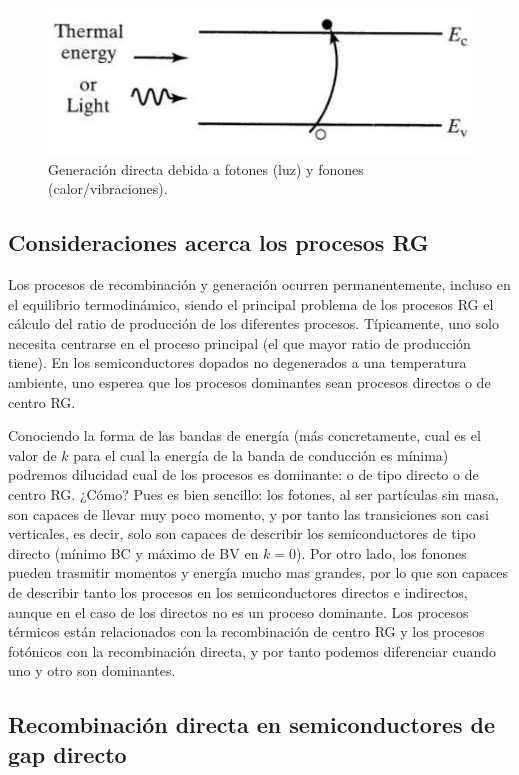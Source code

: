 \begin{figure}[h!] \centering
	\includegraphics[width=0.5\linewidth]{Cuerpo/Ch_02/02_G_Directa.png}
	\caption{Generación directa debida a fotones (luz) y fonones (calor/vibraciones).}
\end{figure}


\subsection{Consideraciones acerca los procesos RG}

Los procesos de recombinación y generación ocurren permanentemente, incluso en el equilibrio termodinámico, siendo el principal problema de los procesos RG el cálculo del ratio de producción de los diferentes procesos. Típicamente, uno solo necesita centrarse en el proceso principal (el que mayor ratio de producción tiene). En los semiconductores dopados no degenerados a una temperatura ambiente, uno esperea que los procesos dominantes sean procesos directos o de centro RG.

Conociendo la forma de las bandas de energía (más concretamente, cual es el valor de $k$ para el cual la energía de la banda de conducción es mínima) podremos dilucidad cual de los procesos es dominante: o de tipo directo o de centro RG. ¿Cómo? Pues es bien sencillo: los fotones, al ser partículas sin masa, son capaces de llevar muy poco momento, y por tanto las transiciones son casi verticales, es decir, solo son capaces de describir los semiconductores de tipo directo (mínimo BC y máximo de BV en $k=0$). Por otro lado, los fonones pueden trasmitir momentos y energía mucho mas grandes, por lo que son capaces de describir tanto los procesos en los semiconductores directos e indirectos, aunque en el caso de los directos no es un proceso dominante. Los procesos térmicos están relacionados con la recombinación de centro RG y los procesos fotónicos con la recombinación directa, y por tanto podemos diferenciar cuando uno y otro son dominantes.

\subsection{Recombinación directa en semiconductores de gap directo}

